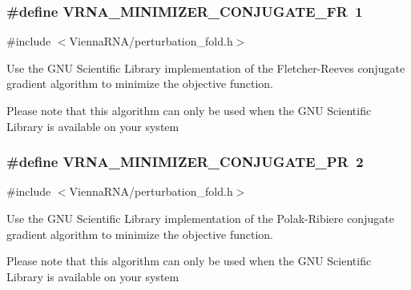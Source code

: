 \subsubsection[{V\+R\+N\+A\+\_\+\+M\+I\+N\+I\+M\+I\+Z\+E\+R\+\_\+\+C\+O\+N\+J\+U\+G\+A\+T\+E\+\_\+\+F\+R}]{\setlength{\rightskip}{0pt plus 5cm}\#define V\+R\+N\+A\+\_\+\+M\+I\+N\+I\+M\+I\+Z\+E\+R\+\_\+\+C\+O\+N\+J\+U\+G\+A\+T\+E\+\_\+\+F\+R~1}\label{group__soft__constraints_gab1d89db58e8c497795a5005f5dbc8c4a}


{\ttfamily \#include $<$Vienna\+R\+N\+A/perturbation\+\_\+fold.\+h$>$}



Use the G\+N\+U Scientific Library implementation of the Fletcher-\/\+Reeves conjugate gradient algorithm to minimize the objective function. 

Please note that this algorithm can only be used when the G\+N\+U Scientific Library is available on your system \hypertarget{group__soft__constraints_ga5aaeafe1b0aa77a5cda18943ff94b02f}{}
\subsubsection[{V\+R\+N\+A\+\_\+\+M\+I\+N\+I\+M\+I\+Z\+E\+R\+\_\+\+C\+O\+N\+J\+U\+G\+A\+T\+E\+\_\+\+P\+R}]{\setlength{\rightskip}{0pt plus 5cm}\#define V\+R\+N\+A\+\_\+\+M\+I\+N\+I\+M\+I\+Z\+E\+R\+\_\+\+C\+O\+N\+J\+U\+G\+A\+T\+E\+\_\+\+P\+R~2}\label{group__soft__constraints_ga5aaeafe1b0aa77a5cda18943ff94b02f}


{\ttfamily \#include $<$Vienna\+R\+N\+A/perturbation\+\_\+fold.\+h$>$}



Use the G\+N\+U Scientific Library implementation of the Polak-\/\+Ribiere conjugate gradient algorithm to minimize the objective function. 

Please note that this algorithm can only be used when the G\+N\+U Scientific Library is available on your system \hypertarget{group__soft__constraints_ga9be8a702cddf58235571ace11cc41b22}{}
